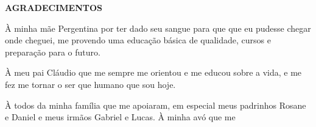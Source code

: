
\begin{center}
	\bfseries\MakeUppercase{AGRADECIMENTOS}\par
\end{center}
	
À minha mãe Pergentina por ter dado seu sangue para que que eu pudesse chegar onde cheguei, me provendo uma educação básica de qualidade, cursos e preparação para o futuro.

À meu pai Cláudio que me sempre me orientou e me educou sobre a vida, e me fez me tornar o ser que humano que sou hoje.

À todos da minha família que me apoiaram, em especial meus padrinhos Rosane e Daniel e meus irmãos Gabriel e Lucas. À minha avó que me 

